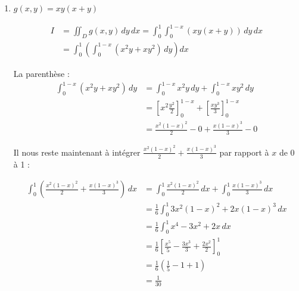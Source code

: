 \begin{solution}
\begin{enumerate}[label=(\alph*)]
        \newpage
        
        \item $g(x,y) = xy(x+y)$

        \[
        \begin{aligned}
        I &= \iint_D g(x, y) \, dy \, dx = \int_0^1 \int_0^{1-x} (xy(x+y)) \, dy \, dx \\
        &= \int_0^1 \left( \int_0^{1-x} (x^2 y + x y^2) \, dy \right) dx
        \end{aligned}
        \]

        La parenthèse :
        \[
        \begin{aligned}
            \int_0^{1-x} (x^2 y + x y^2) \, dy &= \int_0^{1-x} x^2 y \, dy + \int_0^{1-x} x y^2 \, dy \\
            &= \left[ x^2 \frac{y^2}{2} \right]_0^{1-x} + \left[ \frac{x y^3}{3} \right]_0^{1-x} \\
            &= \frac{x^2 (1-x)^2}{2} - 0 + \frac{x (1-x)^3}{3} - 0
        \end{aligned}
        \]

        Il nous reste maintenant à intégrer \( \frac{x^2 (1-x)^2}{2} + \frac{x (1-x)^3}{3} \) par rapport à \( x \) de 0 à 1 :

        \[
        \begin{aligned}
            \int_0^{1} (\frac{x^2 (1-x)^2}{2} + \frac{x (1-x)^3}{3}) \, dx &= \int_0^{1} \frac{x^2 (1-x)^2}{2} \, dx + \int_0^{1} \frac{x (1-x)^3}{3} \, dx \\
            &= \frac{1}{6} \int_0^{1} 3x^2 (1-x)^2 + 2x (1-x)^3 \, dx \\
            &= \frac{1}{6} \int_0^{1} x^4 - 3x^2 + 2x \, dx \\
            &= \frac{1}{6} \left[ \frac{x^5}{5} - \frac{3x^3}{3} + \frac{2x^2}{2} \right]_0^{1} \\
            &= \frac{1}{6} \left( \frac{1}{5} - 1 + 1\right) \\
            &= \frac{1}{30}
        \end{aligned}
        \]
    \end{enumerate}
\end{solution}

